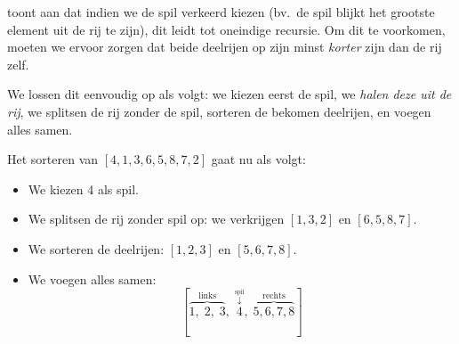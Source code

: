  toont aan dat indien
we de spil verkeerd kiezen (bv.\ de spil blijkt het grootste element uit de rij te zijn),
dit leidt tot oneindige recursie. Om dit te voorkomen,
moeten we ervoor zorgen dat beide deelrijen op zijn minst
\emph{korter} zijn dan de rij zelf.

We lossen dit eenvoudig op als volgt: we kiezen eerst de spil, we \emph{halen deze uit de rij},
we splitsen de rij zonder de spil, sorteren de bekomen deelrijen, en voegen alles samen.

\begin{example}
Het sorteren van $[4,1,3,6,5,8,7,2]$ gaat nu als volgt:
\begin{itemize}
  \item We kiezen 4 als spil.
  \item We splitsen de rij zonder spil op: we verkrijgen $[1,3,2]$ en $[6,5,8,7]$.
  \item We sorteren de deelrijen: $[1,2,3]$ en $[5,6,7,8]$.
  \item We voegen alles samen:
        \[
          [ \overbrace{1,\;2,\;3}^{\textrm{links}},\;
          \stackrel{\stackrel{\scriptstyle\textrm{spil}}{\downarrow}}{4},\;
          \overbrace{5,6,7,8}^{\textrm{rechts}} ]
        \]
\end{itemize}
\end{example}


